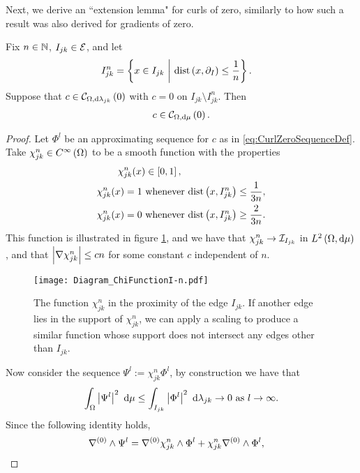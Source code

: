 Next, we derive an ``extension lemma" for curls of zero, similarly to how such a result was also derived for gradients of zero.
\begin{lemma} \label{lem:CurlZeroExtensionLemma}
	Fix $n\in\mathbb{N}$, $I_{jk}\in\mathcal{E}$, and let 
	\begin{align*}
		I_{jk}^n &= \left\{ x\in I_{jk} \ \middle\vert \  \mathrm{dist}\left( x, \partial_I \right) \leq \frac{1}{n} \right\}.
	\end{align*}
	Suppose that $c\in\mathcal{C}_{ \Omega, \mathrm{d}\lambda_{jk}}\left( 0 \right)$ with $c=0$ on $I_{jk}\setminus I_{jk}^n$.
	Then
	\begin{align*}
		c\in\mathcal{C}_{ \Omega, \mathrm{d}\mu}\left( 0 \right).
	\end{align*}
\end{lemma}
\begin{proof}
	Let $\Phi^l$ be an approximating sequence for $c$ as in \eqref{eq:CurlZeroSequenceDef}.
	Take $\chi_{jk}^n\in C^{\infty}\left( \Omega \right)$ to be a smooth function with the properties
	\begin{align*}
		\chi_{jk}^n(x) &\in\sqbracs{0,1}, \\
		\chi_{jk}^n(x) = 1 \ &\text{whenever} \ \mathrm{dist}\bracs{x, I_{jk}^n} \leq \recip{3n}, \\
		\chi_{jk}^n(x) = 0 \ &\text{whenever} \ \mathrm{dist}\bracs{x, I_{jk}^n} \geq \frac{2}{3n}.
	\end{align*}
	This function is illustrated in figure \ref{fig:Diagram_ChiFunctionI-n}, and we have that $\chi_{jk}^n\rightarrow \mathcal{I}_{I_{jk}}$ in $L^{2}\left( \Omega,\mathrm{d}\mu \right)$, and that $\left\lvert \nabla\chi_{jk}^n \right\rvert\leq cn$ for some constant $c$ independent of $n$.
	\begin{figure}[t]
		\centering
		\texttt{[image: Diagram\_ChiFunctionI-n.pdf]}
		\caption{\label{fig:Diagram_ChiFunctionI-n} The function $\chi_{jk}^n$ in the proximity of the edge $I_{jk}$. If another edge lies in the support of $\chi_{jk}^n$, we can apply a scaling to produce a similar function whose support does not intersect any edges other than $I_{jk}$.}
	\end{figure}
	Now consider the sequence $\Psi^l := \chi_{jk}^n \Phi^l$, by construction we have that
	\begin{align*}
		\int_{\Omega} \left\lvert \Psi^l \right\rvert^2  \ \mathrm{d}\mu \leq \int_{I_{jk}} \left\lvert \Phi^l \right\rvert^2  \ \mathrm{d}\lambda_{jk} \rightarrow 0 \ \text{as} \ l \rightarrow\infty.
	\end{align*}
	Since the following identity holds,
	\begin{align*}
		\grad^{(0)}\wedge\Psi^l &= \grad^{(0)}\chi_{jk}^n\wedge\Phi^l + \chi_{jk}^n\grad^{(0)}\wedge\Phi^l,

\end{align*}
\end{proof}
